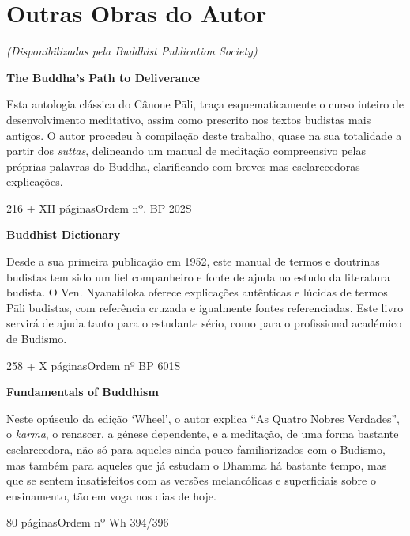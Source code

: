 \chapter{Outras Obras do Autor}

{\centering
  \emph{(Disponibilizadas pela Buddhist Publication Society)}
\par}

\bigskip

\textbf{The Buddha's Path to Deliverance}

Esta antologia clássica do Cânone Pāli, traça esquematicamente o curso inteiro de desenvolvimento meditativo, assim como prescrito nos textos budistas mais antigos. O autor procedeu à compilação deste trabalho, quase na sua totalidade a partir dos \emph{suttas}, delineando um manual de meditação compreensivo pelas próprias palavras do Buddha, clarificando com breves mas esclarecedoras explicações.

216 + XII páginas\hfill Ordem nº. BP 202S

\bigskip

\textbf{Buddhist Dictionary}

Desde a sua primeira publicação em 1952, este manual de termos e doutrinas
budistas tem sido um fiel companheiro e fonte de ajuda no estudo da literatura
budista. O Ven. Nyanatiloka oferece explicações autênticas e lúcidas de termos
Pāli budistas, com referência cruzada e igualmente fontes referenciadas. Este
livro servirá de ajuda tanto para o estudante sério, como para o profissional
académico de Budismo.

258 + X páginas\hfill Ordem nº BP 601S

\clearpage

\textbf{Fundamentals of Buddhism}

Neste opúsculo da edição `Wheel', o autor explica ``As Quatro Nobres Verdades'',
o \emph{karma}, o renascer, a génese dependente, e a meditação, de uma forma
bastante esclarecedora, não só para aqueles ainda pouco familiarizados com o
Budismo, mas também para aqueles que já estudam o Dhamma há bastante
tempo, mas que se sentem insatisfeitos com as versões melancólicas e
superficiais sobre o ensinamento, tão em voga nos dias de hoje.

80 páginas\hfill Ordem nº Wh 394/396

